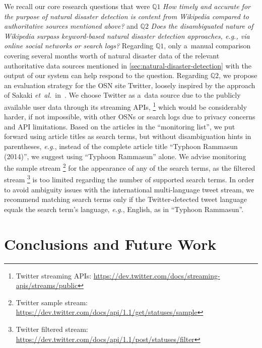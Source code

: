 \documentclass[runningheads,a4paper]{llncs}
\begin{document}
We recall our core research questions that were
$\mathbb{Q}1$ \emph{How timely and accurate for the purpose
of natural disaster detection is content from Wikipedia
compared to authoritative sources mentioned above?} and
$\mathbb{Q}2$ \emph{Does the disambiguated nature of Wikipedia
surpass keyword-based natural disaster detection approaches,
\emph{e.g.}, via online social networks or search logs?}
Regarding $\mathbb{Q}1$, only a~manual comparison
covering several months worth
of natural disaster data of the relevant authoritative data sources
mentioned in \autoref{sec:natural-disaster-detection}
with the output of our system can help respond to the question.
Regarding $\mathbb{Q}2$, we propose an evaluation strategy
for the OSN site Twitter,
loosely inspired by the approach of Sakaki \emph{et~al.}\
in~\cite{sakaki2010earthquake}.
We choose Twitter as a~data source due to the publicly available user data
through its streaming APIs,%
\footnote{Twitter streaming APIs:
\url{https://dev.twitter.com/docs/streaming-apis/streams/public}}
which would be considerably harder, if not impossible, with other OSNs or search logs
due to privacy concerns and API limitations.
Based on the articles in the ``monitoring list'',
we put forward using article titles as search terms,
but without disambiguation hints in parentheses,
\emph{e.g.}, instead of the complete article title
``Typhoon Rammasun (2014)'', we suggest using ``Typhoon Rammasun'' alone.
We advise monitoring the sample stream%
\footnote{Twitter sample stream:
\url{https://dev.twitter.com/docs/api/1.1/get/statuses/sample}}
for the appearance of any of the search terms,
as the filtered stream%
\footnote{Twitter filtered stream:
\url{https://dev.twitter.com/docs/api/1.1/post/statuses/filter}}
is too limited regarding the number of supported search terms.
In order to avoid ambiguity issues with the
international multi-language tweet stream,
we recommend matching search terms only
if the Twitter-detected tweet language equals
the search term's language, \emph{e.g.}, English, as in ``Typhoon Rammasun''.


\section{Conclusions and Future Work}
\end{document}
